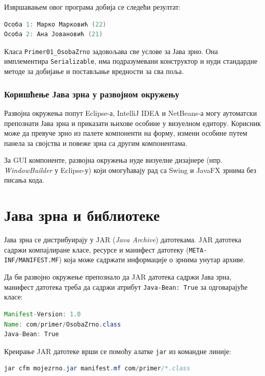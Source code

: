 Извршавањем овог програма добија се следећи резултат:


\begin{lstlisting}[language=Java]
Особа 1: Марко Марковић (22)
Особа 2: Ана Јовановић (21)
\end{lstlisting}


Класа \texttt{Primer01\_OsobaZrno} задовољава све услове за Јава зрно. Она имплементира \texttt{Serializable}, има подразумевани конструктор и нуди стандардне методе за добијање и постављање вредности за сва поља.


\subsubsection{Коришћење Јава зрна у развојном окружењу}

Развојна окружења попут Eclipse-а, IntelliJ IDEA и NetBeans-а могу аутоматски препознати Јава зрна и приказати њихове особине у визуелном едитору. Корисник може да превуче зрно из палете компоненти на форму, измени особине путем панела за својства и повеже зрна са другим компонентама.

За GUI компоненте, развојна окружења нуде визуелне дизајнере (нпр. \textit{WindowBuilder} у Eclipse-у) који омогућавају рад са Swing и JavaFX зрнима без писања кода.


\section{Јава зрна и библиотеке}

Јава зрна се дистрибуирају у JAR (\textit{Java Archive}) датотекама. JAR датотека садржи компајлиране класе, ресурсе и манифест датотеку (\texttt{META-INF/MANIFEST.MF}) која може садржати информације о зрнима унутар архиве.

Да би развојно окружење препознало да JAR датотека садржи Јава зрна, манифест датотека треба да садржи атрибут \texttt{Java-Bean: True} за одговарајуће класе:


\begin{lstlisting}[language=Java]
Manifest-Version: 1.0
Name: com/primer/OsobaZrno.class
Java-Bean: True
\end{lstlisting}


Креирање JAR датотеке врши се помоћу алатке \texttt{jar} из командне линије:


\begin{lstlisting}[language=Java]
jar cfm mojezrno.jar manifest.mf com/primer/*.class
\end{lstlisting}



